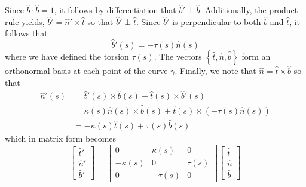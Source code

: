 Since $\hat{b}\cdot\hat{b}=1$, it follows by differentiation that $\hat{b}'
\perp \hat{b}$. Additionally, the product rule yields, $\hat{b}' = \hat{n}' \times
\hat{t}$ so that $\hat{b}' \perp \hat{t}$. Since $\hat{b}'$ is perpendicular to
both $\hat{b}$ and $\hat{t}$, it follows that
\begin{equation}
  \hat{b}'(s) = - \tau(s)\hat{n}(s)
\end{equation}
where we have defined the torsion $\tau(s)$. The vectors $\left\{\hat{t},
    \hat{n}, \hat{b} \right \}$ form an orthonormal basis at each point of the
curve $\gamma$. Finally, we note that $\hat{n}  = \hat{t} \times \hat{b}$ so
that
\begin{align}
  \hat{n}'(s) &= \hat{t}'(s)\times \hat{b}(s) + \hat{t}(s) \times \hat{b}'(s) \\
              &= \kappa(s)\hat{n}(s)\times\hat{b}(s) + \hat{t}(s) \times (-\tau(s)\hat{n}(s)) \\
  &= - \kappa(s)\hat{t}(s) + \tau(s)\hat{b}(s)
\end{align}
which in matrix form becomes
\begin{equation}
  \begin{bmatrix} \hat{t}' \\ \hat{n}' \\ \hat{b}' \end{bmatrix} = \begin{bmatrix}
    0 & \kappa(s) & 0 \\
    - \kappa(s) & 0 & \tau(s) \\
    0 & -\tau(s) & 0
    \end{bmatrix} \begin{bmatrix} \hat{t} \\ \hat{n} \\ \hat{b} \end{bmatrix}
\end{equation}

